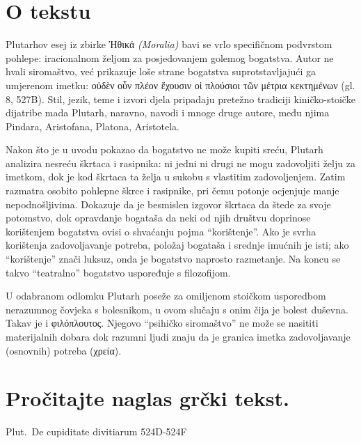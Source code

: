 


\section*{O tekstu}

Plutarhov esej iz zbirke Ἠθικά \textit{(Moralia)} bavi se vrlo specifičnom podvrstom pohlepe: iracionalnom željom za posjedovanjem golemog bogatstva. Autor ne hvali siromaštvo, već prikazuje loše strane bogatstva suprotstavljajući ga umjerenom imetku: \textgreek[variant=ancient]{οὐδὲν οὖν πλέον ἔχουσιν οἱ πλούσιοι τῶν μέτρια κεκτημένων} (gl. 8, 527B). Stil, jezik, teme i izvori djela pripadaju pretežno tradiciji kiničko-stoičke dijatribe mada Plutarh, naravno, navodi i mnoge druge autore, među njima Pindara, Aristofana, Platona, Aristotela.

Nakon što je u uvodu pokazao da bogatstvo ne može kupiti sreću, Plutarh analizira nesreću škrtaca i rasipnika: ni jedni ni drugi ne mogu zadovoljiti želju za imetkom, dok je kod škrtaca ta želja u sukobu s vlastitim zadovoljenjem. Zatim razmatra osobito pohlepne škrce i rasipnike, pri čemu potonje ocjenjuje manje nepodnošljivima. Dokazuje da je besmislen izgovor škrtaca da štede za svoje potomstvo, dok opravdanje bogataša da neki od njih društvu doprinose korištenjem bogatstva ovisi o shvaćanju pojma ``korištenje''. Ako je svrha korištenja zadovoljavanje potreba, položaj bogataša i srednje imućnih je isti; ako ``korištenje'' znači luksuz, onda je bogatstvo naprosto razmetanje. Na koncu se takvo ``teatralno'' bogatstvo uspoređuje s filozofijom.

U odabranom odlomku Plutarh poseže za omiljenom stoičkom usporedbom nerazumnog čovjeka s bolesnikom, u ovom slučaju s onim čija je bolest duševna. Takav je i \textgreek[variant=ancient]{φιλόπλουτος.} Njegovo ``psihičko siromaštvo'' ne može se nasititi materijalnih dobara dok razumni ljudi znaju da je granica imetka zadovoljavanje (osnovnih) potreba \textgreek[variant=ancient]{(χρεία).}


\section*{Pročitajte naglas grčki tekst.}

Plut.\ De cupiditate divitiarum 524D-524F


